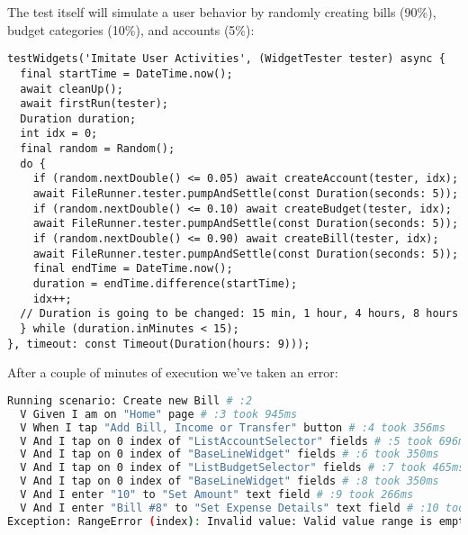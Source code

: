\noindent The test itself will simulate a user behavior by randomly creating bills (90\%), budget categories (10\%),
and accounts (5\%): 

\begin{lstlisting}
testWidgets('Imitate User Activities', (WidgetTester tester) async {
  final startTime = DateTime.now();
  await cleanUp();
  await firstRun(tester);
  Duration duration;
  int idx = 0;
  final random = Random();
  do {
    if (random.nextDouble() <= 0.05) await createAccount(tester, idx);
    await FileRunner.tester.pumpAndSettle(const Duration(seconds: 5));
    if (random.nextDouble() <= 0.10) await createBudget(tester, idx);
    await FileRunner.tester.pumpAndSettle(const Duration(seconds: 5));
    if (random.nextDouble() <= 0.90) await createBill(tester, idx);
    await FileRunner.tester.pumpAndSettle(const Duration(seconds: 5));
    final endTime = DateTime.now();
    duration = endTime.difference(startTime);
    idx++;
  // Duration is going to be changed: 15 min, 1 hour, 4 hours, 8 hours
  } while (duration.inMinutes < 15);
}, timeout: const Timeout(Duration(hours: 9)));
\end{lstlisting}

\noindent After a couple of minutes of execution we've taken an error:

\begin{lstlisting}[language=bash]
Running scenario: Create new Bill # :2
  V Given I am on "Home" page # :3 took 945ms
  V When I tap "Add Bill, Income or Transfer" button # :4 took 356ms
  V And I tap on 0 index of "ListAccountSelector" fields # :5 took 696ms
  V And I tap on 0 index of "BaseLineWidget" fields # :6 took 350ms
  V And I tap on 0 index of "ListBudgetSelector" fields # :7 took 465ms
  V And I tap on 0 index of "BaseLineWidget" fields # :8 took 350ms
  V And I enter "10" to "Set Amount" text field # :9 took 266ms
  V And I enter "Bill #8" to "Set Expense Details" text field # :10 took 266ms
Exception: RangeError (index): Invalid value: Valid value range is empty: -1
\end{lstlisting}
